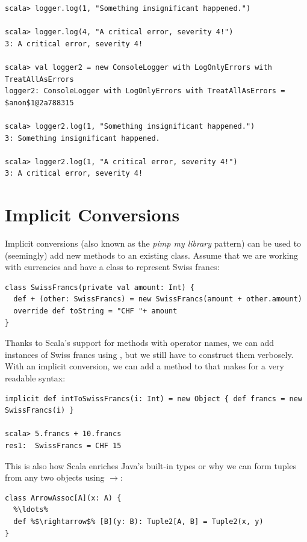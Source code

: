 \documentclass[10pt,a4paper,oneside]{scrreprt}
\begin{document}
{\begin{lstlisting}
scala> logger.log(1, "Something insignificant happened.")

scala> logger.log(4, "A critical error, severity 4!")
3: A critical error, severity 4!

scala> val logger2 = new ConsoleLogger with LogOnlyErrors with TreatAllAsErrors
logger2: ConsoleLogger with LogOnlyErrors with TreatAllAsErrors = $anon$1@2a788315

scala> logger2.log(1, "Something insignificant happened.")
3: Something insignificant happened.

scala> logger2.log(1, "A critical error, severity 4!")
3: A critical error, severity 4!
\end{lstlisting}

\section{Implicit Conversions} \label{section:implicit-conversions}

Implicit conversions (also known as the \textit{pimp my library} pattern) can be used to (seemingly) add new methods to an existing class. Assume that we are working with currencies and have a class to represent Swiss francs:

\begin{lstlisting}
class SwissFrancs(private val amount: Int) {
  def + (other: SwissFrancs) = new SwissFrancs(amount + other.amount)
  override def toString = "CHF "+ amount
}
\end{lstlisting}

Thanks to Scala's support for methods with operator names, we can add instances of Swiss francs using \src{+}, but we still have to construct them verbosely. With an implicit conversion, we can add a  method to  that makes for a very readable syntax:

\begin{lstlisting}
implicit def intToSwissFrancs(i: Int) = new Object { def francs = new SwissFrancs(i) }

scala> 5.francs + 10.francs
res1:  SwissFrancs = CHF 15
\end{lstlisting}

This is also how Scala enriches Java's built-in types or why we can form tuples from any two objects using $\rightarrow$:

\begin{lstlisting}
class ArrowAssoc[A](x: A) {
  %\ldots%
  def %$\rightarrow$% [B](y: B): Tuple2[A, B] = Tuple2(x, y)
}


\end{lstlisting}}
\end{document}
